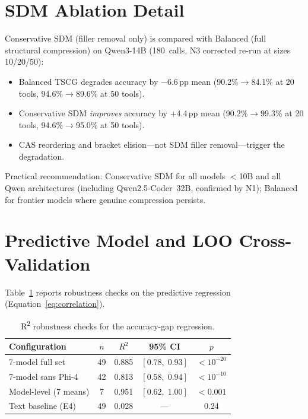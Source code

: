 \documentclass[11pt,a4paper]{article}
\begin{document}
\section{SDM Ablation Detail}
\label{app:sdm-detail}

Conservative SDM (filler removal only) is compared with Balanced (full structural compression) on Qwen3-14B (180~calls, N3 corrected re-run at sizes 10/20/50):

\begin{itemize}[noitemsep]
    \item Balanced TSCG degrades accuracy by $-$6.6\,pp mean (90.2\%$\to$84.1\% at 20 tools, 94.6\%$\to$89.6\% at 50 tools).
    \item Conservative SDM \emph{improves} accuracy by $+$4.4\,pp mean (90.2\%$\to$99.3\% at 20 tools, 94.6\%$\to$95.0\% at 50 tools).
    \item CAS reordering and bracket elision---not SDM filler removal---trigger the degradation.
\end{itemize}

\noindent Practical recommendation: Conservative SDM for all models ${<}$10B and all Qwen architectures (including Qwen2.5-Coder~32B, confirmed by N1); Balanced for frontier models where genuine compression persists.

\section{Predictive Model and LOO Cross-Validation}
\label{app:loo-details}

Table~\ref{tab:r2-robustness} reports robustness checks on the predictive regression (Equation~\ref{eq:correlation}).

\begin{table}[h]
\centering
\small
\caption{R\textsuperscript{2} robustness checks for the accuracy-gap regression.}
\label{tab:r2-robustness}
\begin{tabular}{@{}lcccc@{}}
\toprule
\textbf{Configuration} & $n$ & $R^2$ & \textbf{95\% CI} & $p$ \\
\midrule
7-model full set & 49 & 0.885 & $[0.78,\; 0.93]$ & $< 10^{-20}$ \\
7-model sans Phi-4 & 42 & 0.813 & $[0.58,\; 0.94]$ & $< 10^{-10}$ \\
Model-level (7 means) & 7 & 0.951 & $[0.62,\; 1.00]$ & $< 0.001$ \\
Text baseline (E4) & 49 & 0.028 & --- & 0.24 \\
\bottomrule
\end{tabular}
\end{table}
\end{document}
